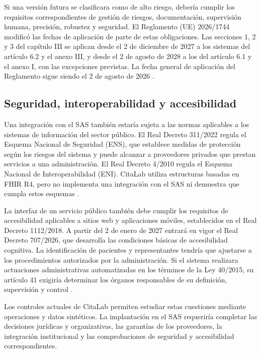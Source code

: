 Si una versión futura se clasificara como de alto riesgo, debería cumplir los requisitos correspondientes de gestión de riesgos, documentación, supervisión humana, precisión, robustez y seguridad. El Reglamento (UE) 2026/1744 modificó las fechas de aplicación de parte de estas obligaciones. Las secciones 1, 2 y 3 del capítulo III se aplican desde el 2 de diciembre de 2027 a los sistemas del artículo 6.2 y el anexo III, y desde el 2 de agosto de 2028 a los del artículo 6.1 y el anexo I, con las excepciones previstas. La fecha general de aplicación del Reglamento sigue siendo el 2 de agosto de 2026 \citep{eu2026aiactamendment}.

\subsection{Seguridad, interoperabilidad y accesibilidad}

Una integración con el SAS también estaría sujeta a las normas aplicables a los sistemas de información del sector público. El Real Decreto 311/2022 regula el Esquema Nacional de Seguridad (ENS), que establece medidas de protección según los riesgos del sistema y puede alcanzar a proveedores privados que prestan servicios a una administración. El Real Decreto 4/2010 regula el Esquema Nacional de Interoperabilidad (ENI). CitaLab utiliza estructuras basadas en FHIR R4, pero no implementa una integración con el SAS ni demuestra que cumpla estos esquemas \citep{es2010rd4eni,es2022rd311ens}.

La interfaz de un servicio público también debe cumplir los requisitos de accesibilidad aplicables a sitios web y aplicaciones móviles, establecidos en el Real Decreto 1112/2018. A partir del 2 de enero de 2027 entrará en vigor el Real Decreto 707/2026, que desarrolla las condiciones básicas de accesibilidad cognitiva. La identificación de pacientes y representantes tendría que ajustarse a los procedimientos autorizados por la administración. Si el sistema realizara actuaciones administrativas automatizadas en los términos de la Ley 40/2015, su artículo 41 exigiría determinar los órganos responsables de su definición, supervisión y control \citep{es2018rd1112,es2026rd707accesibilidad,es2015ley40}.

Los controles actuales de CitaLab permiten estudiar estas cuestiones mediante operaciones y datos sintéticos. La implantación en el SAS requeriría completar las decisiones jurídicas y organizativas, las garantías de los proveedores, la integración institucional y las comprobaciones de seguridad y accesibilidad correspondientes.

